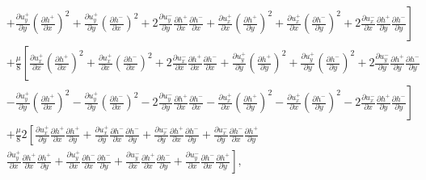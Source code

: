 \documentclass[aps,prx,10pt,twocolumn,superscriptaddress]{revtex4}
\begin{document}
\begin{widetext}
\begin{align}
&\left.  +\frac{\partial u^{+}_{y}}{\partial y} \left( \frac{\partial h^{+}}{\partial x}\right)^2 +  \frac{\partial u^{+}_{y}}{\partial y} \left( \frac{\partial h^{-}}{\partial x}\right)^2 + 2 \frac{\partial u^{-}_{y}}{\partial y}  \frac{\partial h^{+}}{\partial x}\frac{\partial h^{-}}{\partial x} +  \frac{\partial u^{+}_{x}}{\partial x} \left( \frac{\partial h^{+}}{\partial y}\right)^2 +  \frac{\partial u^{+}_{x}}{\partial x} \left( \frac{\partial h^{-}}{\partial y}\right)^2 + 2 \frac{\partial u^{-}_{x}}{\partial x}  \frac{\partial h^{+}}{\partial y}\frac{\partial h^{-}}{\partial y} \right]\nonumber\\
&+\frac{\mu}{8}\left[  \frac{\partial u^{+}_{x}}{\partial x} \left( \frac{\partial h^{+}}{\partial x}\right)^2 +  \frac{\partial u^{+}_{x}}{\partial x} \left( \frac{\partial h^{-}}{\partial x}\right)^2 + 2 \frac{\partial u^{-}_{x}}{\partial x}  \frac{\partial h^{+}}{\partial x}\frac{\partial h^{-}}{\partial x} +  \frac{\partial u^{+}_{y}}{\partial y} \left( \frac{\partial h^{+}}{\partial y}\right)^2 +  \frac{\partial u^{+}_{y}}{\partial y} \left( \frac{\partial h^{-}}{\partial y}\right)^2 + 2 \frac{\partial u^{-}_{y}}{\partial y}  \frac{\partial h^{+}}{\partial y}\frac{\partial h^{-}}{\partial y}\right. \nonumber\\
&\left.  -\frac{\partial u^{+}_{y}}{\partial y} \left( \frac{\partial h^{+}}{\partial x}\right)^2 -  \frac{\partial u^{+}_{y}}{\partial y} \left( \frac{\partial h^{-}}{\partial x}\right)^2 - 2 \frac{\partial u^{-}_{y}}{\partial y}  \frac{\partial h^{+}}{\partial x}\frac{\partial h^{-}}{\partial x} -  \frac{\partial u^{+}_{x}}{\partial x} \left( \frac{\partial h^{+}}{\partial y}\right)^2 -  \frac{\partial u^{+}_{x}}{\partial x} \left( \frac{\partial h^{-}}{\partial y}\right)^2 - 2 \frac{\partial u^{-}_{x}}{\partial x}  \frac{\partial h^{+}}{\partial y}\frac{\partial h^{-}}{\partial y} \right]\nonumber\\
&+\frac{\mu}{8}2\left[  \frac{\partial u^{+}_{x}}{\partial y}  \frac{\partial h^{+}}{\partial x}\frac{\partial h^{+}}{\partial y} +  \frac{\partial u^{+}_{x}}{\partial y}  \frac{\partial h^{-}}{\partial x}\frac{\partial h^{-}}{\partial y}  +  \frac{\partial u^{-}_{x}}{\partial y}  \frac{\partial h^{+}}{\partial x}\frac{\partial h^{-}}{\partial y} +  \frac{\partial u^{-}_{x}}{\partial y}  \frac{\partial h^{-}}{\partial x}\frac{\partial h^{+}}{\partial y} \right. \nonumber\\
&\left.  \frac{\partial u^{+}_{y}}{\partial x} \frac{\partial h^{+}}{\partial x}\frac{\partial h^{+}}{\partial y} +  \frac{\partial u^{+}_{y}}{\partial x} \frac{\partial h^{-}}{\partial x}\frac{\partial h^{-}}{\partial y}+  \frac{\partial u^{-}_{y}}{\partial x} \frac{\partial h^{+}}{\partial x}\frac{\partial h^{-}}{\partial y} +  \frac{\partial u^{-}_{y}}{\partial x}  \frac{\partial h^{-}}{\partial x}\frac{\partial h^{+}}{\partial y}  \right],\nonumber\\

\end{align}
\end{widetext}
\end{document}

